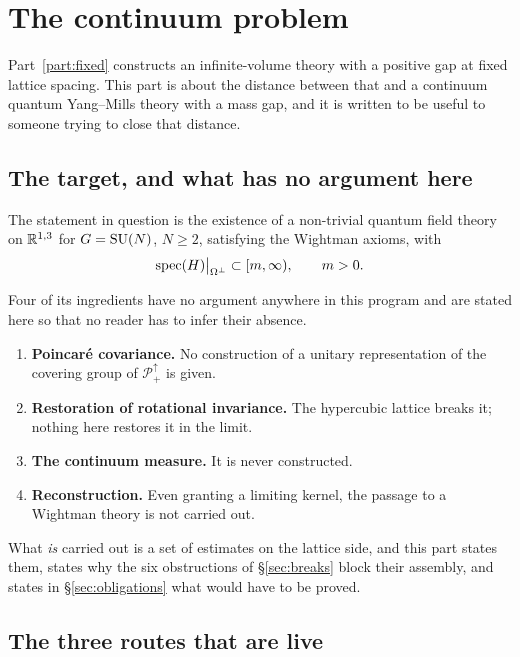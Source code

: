 \section{The continuum problem}
\label{sec:continuum}

Part~\ref{part:fixed} constructs an infinite-volume theory with a
positive gap at fixed lattice spacing. This part is about the distance
between that and a continuum quantum Yang--Mills theory with a mass gap,
and it is written to be useful to someone trying to close that distance.

\subsection{The target, and what has no argument here}

The statement in question is the existence of a non-trivial quantum
field theory on $\mathbb{R}^{1,3}$ for $G = \mathrm{SU}(N)$, $N \ge 2$, satisfying the
Wightman axioms, with
\begin{equation}
  \operatorname{spec}(H)\big|_{\Omega^{\perp}} \subset [m, \infty),
  \qquad m > 0 .
\end{equation}

Four of its ingredients have no argument anywhere in this program and
are stated here so that no reader has to infer their absence.

\begin{enumerate}
  \item \textbf{Poincar\'e covariance.} No construction of a unitary
    representation of the covering group of $\mathcal{P}_+^{\uparrow}$ is
    given.
  \item \textbf{Restoration of rotational invariance.} The hypercubic
    lattice breaks it; nothing here restores it in the limit.
  \item \textbf{The continuum measure.} It is never constructed.
  \item \textbf{Reconstruction.} Even granting a limiting kernel, the
    passage to a Wightman theory is not carried out.
\end{enumerate}

What \emph{is} carried out is a set of estimates on the lattice side,
and this part states them, states why the six obstructions of
\S\ref{sec:breaks} block their assembly, and states in
\S\ref{sec:obligations} what would have to be proved.

\subsection{The three routes that are live}

